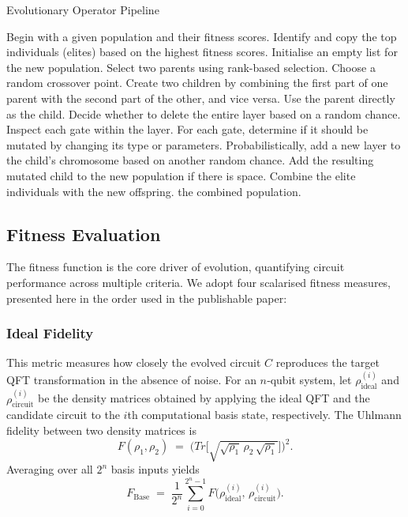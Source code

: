 \documentclass[11pt,a4paper]{article}
\begin{document}
\begin{algorithm}[H]
\caption{Evolutionary Operator Pipeline}
\begin{algorithmic}[1]
\State Begin with a given population and their fitness scores.
\State Identify and copy the top individuals (elites) based on the highest fitness scores.
\State Initialise an empty list for the new population.
    \State Select two parents using rank-based selection.
        \State Choose a random crossover point.
        \State Create two children by combining the first part of one parent with the second part of the other, and vice versa.
    \Else
        \State Use the parent directly as the child.
    \EndIf
            \State Decide whether to delete the entire layer based on a random chance.
                \State Inspect each gate within the layer.
                \State For each gate, determine if it should be mutated by changing its type or parameters.
            \EndIf
        \EndFor
        \State Probabilistically, add a new layer to the child's chromosome based on another random chance.
        \State Add the resulting mutated child to the new population if there is space.
    \EndFor
\EndWhile
\State Combine the elite individuals with the new offspring.
\State \Return the combined population.
\end{algorithmic}
\end{algorithm}

\subsection{Fitness Evaluation}
The fitness function is the core driver of evolution, quantifying circuit performance across multiple criteria.  We adopt four scalarised fitness measures, presented here in the order used in the publishable paper:

\subsubsection*{Ideal Fidelity}
This metric measures how closely the evolved circuit $C$ reproduces the target QFT transformation in the absence of noise.  For an $n$‐qubit system, let $\rho_{\mathrm{ideal}}^{(i)}$ and $\rho_{\mathrm{circuit}}^{(i)}$ be the density matrices obtained by applying the ideal QFT and the candidate circuit to the $i$th computational basis state, respectively.  The Uhlmann fidelity between two density matrices is
\[
F(\rho_1,\rho_2)\;=\;\bigl(Tr\bigl[\sqrt{\sqrt{\rho_1}\,\rho_2\,\sqrt{\rho_1}}\bigr]\bigr)^2.
\]
Averaging over all $2^n$ basis inputs yields
\begin{equation}
  F_{\mathrm{Base}}
  \;=\;\frac{1}{2^n}\sum_{i=0}^{2^n-1}
    F\bigl(\rho_{\mathrm{ideal}}^{(i)},\,\rho_{\mathrm{circuit}}^{(i)}\bigr).
\end{equation}
\end{document}
